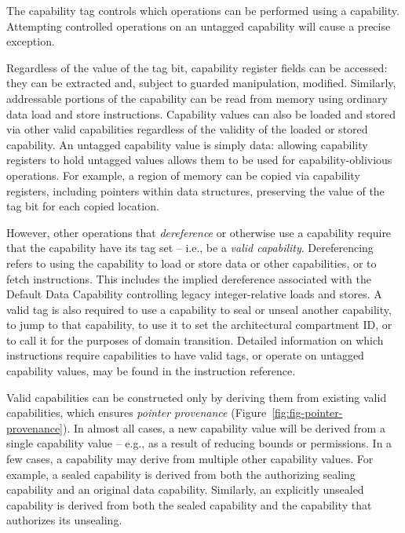 The capability tag controls which operations can be performed using a
capability.
Attempting controlled operations on an untagged capability will cause a
precise exception.

Regardless of the value of the tag bit, capability register fields can be
accessed: they can be extracted and, subject to guarded manipulation,
modified.
Similarly, addressable portions of the capability can be read from memory
using ordinary data load and store instructions.
Capability values can also be loaded and stored via other valid capabilities
regardless of the validity of the loaded or stored capability.
An untagged capability value is simply data: allowing capability registers to
hold untagged values allows them to be used for capability-oblivious
operations.
For example, a region of memory can be copied via capability registers, including pointers within data structures, preserving the value of the
tag bit for each copied location.

However, other operations that \textit{dereference} or otherwise use a
capability require that the capability have its tag set -- i.e., be a
\textit{valid capability}.
Dereferencing refers to using the capability to load or store data or other
capabilities, or to fetch instructions.
This includes the implied dereference associated with the Default Data
Capability controlling legacy integer-relative loads and stores.
A valid tag is also required to use a capability to seal or unseal another
capability, to jump to that capability, to use it to set the architectural
compartment ID, or to call it for the purposes of domain transition.
Detailed information on which instructions require capabilities to have valid
tags, or operate on untagged capability values, may be found in the
instruction reference.

Valid capabilities can be constructed only by deriving them from existing
valid capabilities, which ensures \textit{pointer provenance}
(Figure~\ref{fig:fig-pointer-provenance}).
In almost all cases, a new capability value will be derived from a single
capability value -- e.g., as a result of reducing bounds or permissions.
In a few cases, a capability may derive from multiple other capability
values.
For example, a sealed capability is derived from both the authorizing sealing
capability and an original data capability.
Similarly, an explicitly unsealed capability is derived from both the sealed
capability and the capability that authorizes its unsealing.

